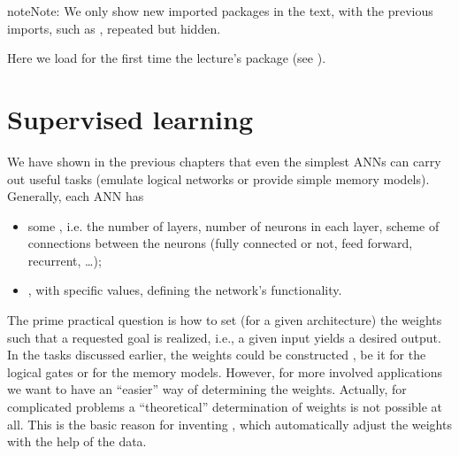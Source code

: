 \documentclass[letterpaper,10pt,english]{jupyterBook}
\begin{document}
\begin{sphinxVerbatim}[commandchars=\\\{\}]
   

                   
 

           
\end{sphinxVerbatim}

\begin{sphinxadmonition}{note}{Note:}
\sphinxAtStartPar
We only show new imported packages in the text, with the previous imports, such as , repeated but hidden.

\sphinxAtStartPar
Here we load for the first time the lecture’s  package (see {\hyperref[\detokenize{docs/appendix:app-lab}]{}}).
\end{sphinxadmonition}


\section{Supervised learning}
\label{\detokenize{docs/perceptron:supervised-learning}}
\sphinxAtStartPar
We have shown in the previous chapters that even the simplest ANNs can carry out useful tasks (emulate logical networks or provide simple memory models). Generally, each ANN has
\begin{itemize}
\item {} 
\sphinxAtStartPar
some , i.e. the number of layers, number of neurons in each layer, scheme of connections between the neurons (fully connected or not, feed forward, recurrent, …);

\item {} 
\sphinxAtStartPar
{}, with specific values, defining the network’s functionality.

\end{itemize}

\sphinxAtStartPar
The prime practical question is how to set (for a given architecture) the weights such that a requested goal is realized, i.e., a given input yields a desired output.
In the tasks discussed earlier, the weights could be constructed , be it for the logical gates or for the memory models. However, for more involved applications we want to have an “easier” way of determining the weights. Actually, for complicated problems a “theoretical” determination of weights is not possible at all. This is the basic reason for inventing , which automatically adjust the weights with the help of the data.
\end{document}
